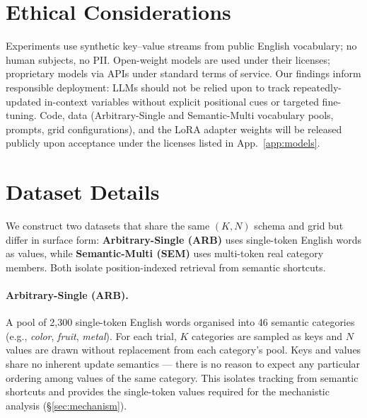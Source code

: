 \documentclass[11pt]{article}
\begin{document}
\section*{Ethical Considerations}

Experiments use synthetic key--value streams from public English
vocabulary; no human subjects, no PII. Open-weight models are used
under their licenses; proprietary models via APIs under standard
terms of service. Our findings inform responsible deployment: LLMs
should not be relied upon to track repeatedly-updated in-context
variables without explicit positional cues or targeted fine-tuning.
Code, data (Arbitrary-Single and Semantic-Multi vocabulary pools,
prompts, grid configurations), and the LoRA adapter weights will be
released publicly upon acceptance under the licenses listed in
App.~\ref{app:models}.



\appendix

\section{Dataset Details}
\label{app:datasets}

We construct two datasets that share the same $(K, N)$ schema and
grid but differ in surface form: \textbf{Arbitrary-Single (ARB)} uses
single-token English words as values, while \textbf{Semantic-Multi
(SEM)} uses multi-token real category members. Both isolate
position-indexed retrieval from semantic shortcuts.

\paragraph{Arbitrary-Single (ARB).}
A pool of 2{,}300 single-token English words organised into 46
semantic categories (e.g., \textit{color}, \textit{fruit},
\textit{metal}).
For each trial, $K$ categories are sampled as keys and $N$ values are
drawn without replacement from each category's pool.
Keys and values share no inherent update semantics --- there is no
reason to expect any particular ordering among values of the same
category.
This isolates tracking from semantic shortcuts and provides the
single-token values required for the mechanistic analysis
(\S\ref{sec:mechanism}).
\end{document}
